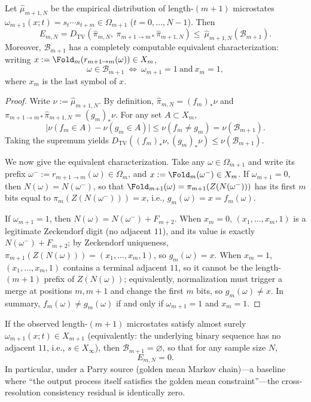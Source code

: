 \begin{proposition}\label{prop:multiscale-residual-by-boundary}
Let $\hat\mu_{m+1,N}$ be the empirical distribution of length-$(m{+}1)$ microstates $\omega_{m+1}(x;t)=s_t\cdots s_{t+m}\in\Omega_{m+1}$ ($t=0,\dots,N-1$). Then
\[
E_{m,N}
=D_{\mathrm{TV}}\!\left(\hat\pi_{m,N},\ \pi_{m+1\to m*}\hat\pi_{m+1,N}\right)
\le\ \hat\mu_{m+1,N}(\mathcal{B}_{m+1}).
\]
Moreover, $\mathcal{B}_{m+1}$ has a completely computable equivalent characterization: writing $x:=\Fold_m(r_{m+1\to m}(\omega))\in X_m$,
\[
\omega\in\mathcal{B}_{m+1}\ \Longleftrightarrow\ \omega_{m+1}=1\ \text{and}\ x_m=1,
\]
where $x_m$ is the last symbol of $x$.
\end{proposition}

\begin{proof}
Write $\nu:=\hat\mu_{m+1,N}$. By definition, $\hat\pi_{m,N}=(f_m)_*\nu$ and $\pi_{m+1\to m*}\hat\pi_{m+1,N}=(g_m)_*\nu$.
For any set $A\subset X_m$,
\[
\bigl|\nu(f_m\in A)-\nu(g_m\in A)\bigr|\le \nu(f_m\ne g_m)=\nu(\mathcal{B}_{m+1}).
\]
Taking the supremum yields $D_{\mathrm{TV}}((f_m)_*\nu,(g_m)_*\nu)\le \nu(\mathcal{B}_{m+1})$.

We now give the equivalent characterization. Take any $\omega\in\Omega_{m+1}$ and write its prefix $\omega^-:=r_{m+1\to m}(\omega)\in\Omega_m$, and $x:=\Fold_m(\omega^-)\in X_m$.
If $\omega_{m+1}=0$, then $N(\omega)=N(\omega^-)$, so that
\(
\Fold_{m+1}(\omega)=\pi_{m+1}(Z(N(\omega^-)))
\)
has its first $m$ bits equal to $\pi_m(Z(N(\omega^-)))=x$, i.e., $g_m(\omega)=x=f_m(\omega)$.

If $\omega_{m+1}=1$, then $N(\omega)=N(\omega^-)+F_{m+2}$.
When $x_m=0$, $(x_1,\dots,x_m,1)$ is a legitimate Zeckendorf digit (no adjacent $11$), and its value is exactly $N(\omega^-)+F_{m+2}$; by Zeckendorf uniqueness,
\(
\pi_{m+1}(Z(N(\omega)))=(x_1,\dots,x_m,1)
\), so $g_m(\omega)=x$.
When $x_m=1$, $(x_1,\dots,x_m,1)$ contains a terminal adjacent $11$, so it cannot be the length-$(m{+}1)$ prefix of $Z(N(\omega))$; equivalently, normalization must trigger a merge at positions $m,m{+}1$ and change the first $m$ bits, so $g_m(\omega)\ne x$.
In summary, $f_m(\omega)\ne g_m(\omega)$ if and only if $\omega_{m+1}=1$ and $x_m=1$.
\end{proof}

\begin{corollary}\label{cor:multiscale-zero-stable}
If the observed length-$(m{+}1)$ microstates satisfy almost surely $\omega_{m+1}(x;t)\in X_{m+1}$ (equivalently: the underlying binary sequence has no adjacent $11$, i.e., $s\in X_\infty$), then $\mathcal{B}_{m+1}=\varnothing$, so that for any sample size $N$,
\[
E_{m,N}=0.
\]
In particular, under a Parry source (golden mean Markov chain)---a baseline where ``the output process itself satisfies the golden mean constraint''---the cross-resolution consistency residual is identically zero.
\end{corollary}

